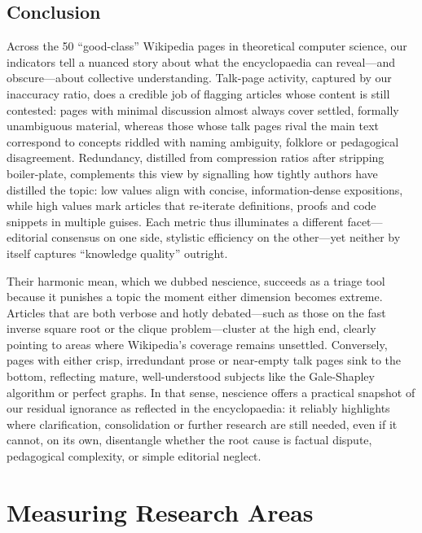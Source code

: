 \subsection{Conclusion}

Across the 50 “good-class” Wikipedia pages in theoretical computer science, our indicators tell a nuanced story about what the encyclopaedia can reveal—and obscure—about collective understanding.  Talk-page activity, captured by our inaccuracy ratio, does a credible job of flagging articles whose content is still contested: pages with minimal discussion almost always cover settled, formally unambiguous material, whereas those whose talk pages rival the main text correspond to concepts riddled with naming ambiguity, folklore or pedagogical disagreement. Redundancy, distilled from compression ratios after stripping boiler-plate, complements this view by signalling how tightly authors have distilled the topic: low values align with concise, information-dense expositions, while high values mark articles that re-iterate definitions, proofs and code snippets in multiple guises.  Each metric thus illuminates a different facet—editorial consensus on one side, stylistic efficiency on the other—yet neither by itself captures “knowledge quality” outright.

Their harmonic mean, which we dubbed nescience, succeeds as a triage tool because it punishes a topic the moment either dimension becomes extreme. Articles that are both verbose and hotly debated—such as those on the fast inverse square root or the clique problem—cluster at the high end, clearly pointing to areas where Wikipedia's coverage remains unsettled. Conversely, pages with either crisp, irredundant prose or near-empty talk pages sink to the bottom, reflecting mature, well-understood subjects like the Gale-Shapley algorithm or perfect graphs. In that sense, nescience offers a practical snapshot of our residual ignorance as reflected in the encyclopaedia: it reliably highlights where clarification, consolidation or further research are still needed, even if it cannot, on its own, disentangle whether the root cause is factual dispute, pedagogical complexity, or simple editorial neglect.

%
%

\section{Measuring Research Areas}
\label{sec:measuring_research_areas}

